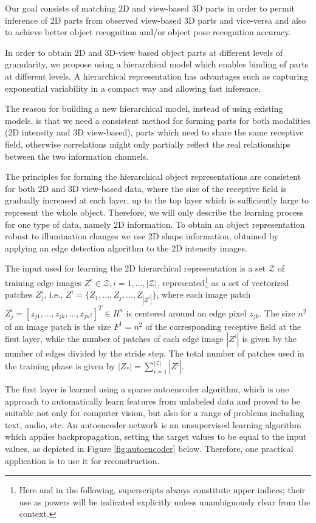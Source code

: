 \documentclass[runningheads]{llncs}
\begin{document}
Our goal consists of matching 2D and view-based 3D parts in order to permit inference of 2D parts from observed view-based 3D parts and vice-versa and also to achieve better object recognition and/or object pose recognition accuracy.  

In order to obtain 2D and 3D-view based object parts at different levels of granularity, we propose using a hierarchical model which enables binding of parts at different levels. A hierarchical representation has advantages such as capturing exponential variability in a compact way and allowing fast inference.

The reason for building a new hierarchical model, instead of using existing models, is that we need a consistent method for forming parts for both modalities (2D intensity and 3D view-based), parts which need to share the same receptive field, otherwise correlations might only partially reflect the real relationships between the two information channels.

The principles for forming the hierarchical object representations are consistent for both 2D and 3D view-based data, where the size of the receptive field is gradually increased at each layer, up to the top layer which is sufficiently large to represent the whole object. Therefore, we will only describe the learning process for one type of data, namely 2D information. To obtain an object representation robust to illumination changes we use 2D shape information, obtained by applying an edge detection algorithm to the 2D intensity images.

The input used for learning the 2D hierarchical representation is a set $\mathcal{Z}$ of training edge images $Z^i \in \mathcal{Z}, i=1,\ldots,|\mathcal{Z}|$, represented\footnote{Here and in the following, superscripts always constitute upper indices; their use as powers will be indicated explicitly unless unambiguously clear from the context.} as a set of vectorized patches $Z_j^i$, i.e., $Z^i=\{Z_1,\ldots,Z_j,\ldots,Z_{|Z^i|}\}$, where each image patch
$Z_j^i=[z_{j1},\ldots,z_{jk},\ldots,z_{jn^2}]^T \in R^n$ is centered around an edge pixel $z_{jk}$. The size $n^2$ of an image patch is the size $F^1=n^2$ of the corresponding receptive field at the first layer, while the number of patches of each edge image $|Z^i|$ is given by the number of edges divided by the stride step. The total number of patches used in the training phase is given by $|Z_*|=\sum_{i=1}^{|\mathcal{Z}|} |Z^i|$.

The first layer is learned using a sparse autoencoder algorithm, which is one approach to automatically learn features from unlabeled data and proved to be suitable not only for computer vision, but also for a range of problems including text, audio, etc. An autoencoder network is an unsupervised learning algorithm which applies backpropagation, setting the target values to be equal to the input values, as depicted in Figure \ref{fig:autoencoder} below. Therefore, one practical application is to use it for reconstruction. 
\end{document}
